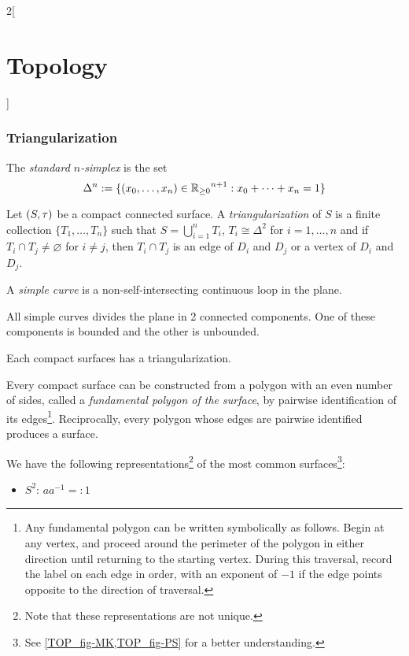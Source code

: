 \documentclass[../../../main.tex]{subfiles}
\begin{document}
\begin{multicols}{2}[\section{Topology}]
  \subsubsection{Triangularization}
  \begin{definition}
    The \emph{standard $n$-simplex} is the set $$\Delta^n:=\{(x_0,\ldots,x_n)\in{\ensuremath{\mathbb{R}}_{\geq 0}}^{n+1}:x_0+\cdots+x_n=1\}$$
  \end{definition}
  \begin{definition}
    Let $(S,\tau)$ be a compact connected surface. A \emph{triangularization} of $S$ is a finite collection $\{T_1,\ldots,T_n\}$ such that $S=\bigcup_{i=1}^nT_i$, $T_i\cong\Delta^2$ for $i=1,\ldots,n$ and if $T_i\cap T_j\ne\varnothing$ for $i\ne j$, then $T_i\cap T_j$ is an edge of $D_i$ and $D_j$ or a vertex of $D_i$ and $D_j$.
  \end{definition}
  \begin{definition}
    A \emph{simple curve} is a non-self-intersecting continuous loop in the plane.
  \end{definition}
  \begin{theorem}
    All simple curves divides the plane in 2 connected components. One of these components is bounded and the other is unbounded.
  \end{theorem}
  \begin{theorem}
    Each compact surfaces has a triangularization.
  \end{theorem}
  \begin{theorem}
    Every compact surface can be constructed from a polygon with an even number of sides, called a \emph{fundamental polygon of the surface}, by pairwise identification of its edges\footnote{Any fundamental polygon can be written symbolically as follows. Begin at any vertex, and proceed around the perimeter of the polygon in either direction until returning to the starting vertex. During this traversal, record the label on each edge in order, with an exponent of $-1$ if the edge points opposite to the direction of traversal.}. Reciprocally, every polygon whose edges are pairwise identified produces a surface.
  \end{theorem}
  \begin{prop}
    We have the following representations\footnote{Note that these representations are not unique.} of the most common surfaces\footnote{See \cref{TOP_fig-MK,TOP_fig-PS} for a better understanding.}:
    \begin{itemize}
      \item $S^2$: $aa^{-1}=:1$

\end{itemize}
\end{prop}
\end{multicols}
\end{document}
